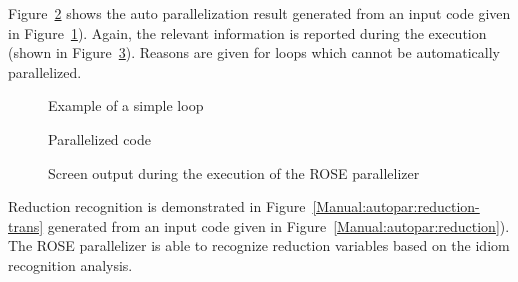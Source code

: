Figure~\ref{Manual:autopar:inner_only-trans} shows the auto parallelization result generated from  an input code given in
Figure~\ref{Manual:autopar:inner_only}).
Again, the relevant information is reported during the execution (shown in Figure~\ref{Manual:autopar:inner_only-output}).
Reasons are given for loops which cannot be automatically parallelized. 

\lstset{language=C,basicstyle=\scriptsize,numbers=left}
\begin{figure}[htbp]
{\indent
  {\mySmallFontSize
    \begin{latexonly}
    
    \end{latexonly}
    \begin{htmlonly}
    
    \end{htmlonly}
  }
}
\caption{Example of a simple loop}
\label{Manual:autopar:inner_only}
\end{figure}

\begin{figure}[htbp]
{\indent
  {\mySmallFontSize
    \begin{latexonly}
    
    \end{latexonly}
    \begin{htmlonly}
    
    \end{htmlonly}
  }
}
\caption{Parallelized code}
\label{Manual:autopar:inner_only-trans}
\end{figure}

\begin{figure}[htbp]
{\indent
  {\mySmallFontSize
    \begin{latexonly}
    
    \end{latexonly}
    \begin{htmlonly}
    
    \end{htmlonly}
  }
}
\caption{Screen output during the execution of the ROSE parallelizer}
\label{Manual:autopar:inner_only-output}
\end{figure}

Reduction recognition is demonstrated in Figure~\ref{Manual:autopar:reduction-trans} generated from  an input code given in
Figure~\ref{Manual:autopar:reduction}).
The ROSE parallelizer is able to recognize reduction variables based on the
idiom recognition analysis.

